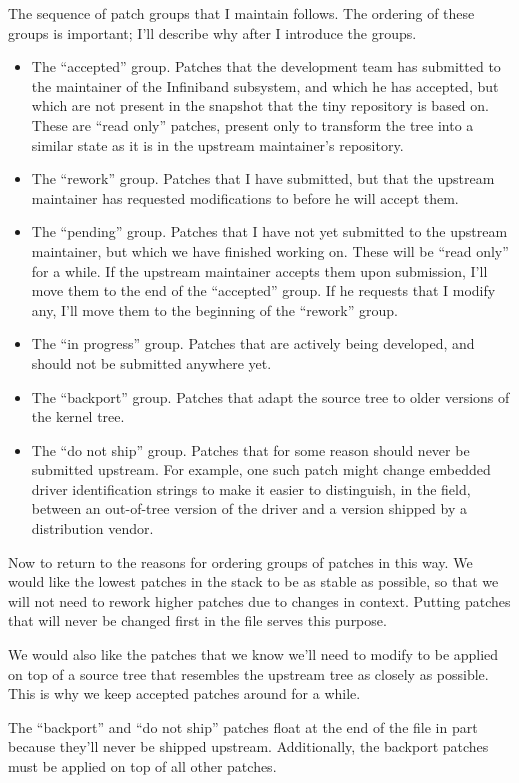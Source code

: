 The sequence of patch groups that I maintain follows.  The ordering of
these groups is important; I'll describe why after I introduce the
groups.
\begin{itemize}
\item The ``accepted'' group.  Patches that the development team has
  submitted to the maintainer of the Infiniband subsystem, and which
  he has accepted, but which are not present in the snapshot that the
  tiny repository is based on.  These are ``read only'' patches,
  present only to transform the tree into a similar state as it is in
  the upstream maintainer's repository.
\item The ``rework'' group.  Patches that I have submitted, but that
  the upstream maintainer has requested modifications to before he
  will accept them.
\item The ``pending'' group.  Patches that I have not yet submitted to
  the upstream maintainer, but which we have finished working on.
  These will be ``read only'' for a while.  If the upstream maintainer
  accepts them upon submission, I'll move them to the end of the
  ``accepted'' group.  If he requests that I modify any, I'll move
  them to the beginning of the ``rework'' group.
\item The ``in progress'' group.  Patches that are actively being
  developed, and should not be submitted anywhere yet.
\item The ``backport'' group.  Patches that adapt the source tree to
  older versions of the kernel tree.
\item The ``do not ship'' group.  Patches that for some reason should
  never be submitted upstream.  For example, one such patch might
  change embedded driver identification strings to make it easier to
  distinguish, in the field, between an out-of-tree version of the
  driver and a version shipped by a distribution vendor.
\end{itemize}

Now to return to the reasons for ordering groups of patches in this
way.  We would like the lowest patches in the stack to be as stable as
possible, so that we will not need to rework higher patches due to
changes in context.  Putting patches that will never be changed first
in the  file serves this purpose.

We would also like the patches that we know we'll need to modify to be
applied on top of a source tree that resembles the upstream tree as
closely as possible.  This is why we keep accepted patches around for
a while.

The ``backport'' and ``do not ship'' patches float at the end of the
 file in part because they'll never be shipped
upstream.  Additionally, the backport patches must be applied on top
of all other patches.

